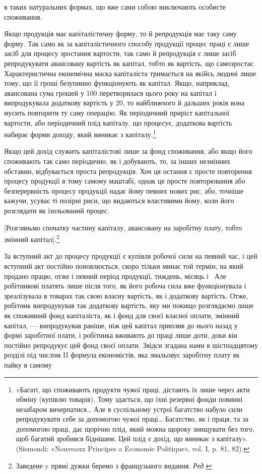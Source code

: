 \parcont{}  %
в таких натуральних формах, що вже сами собою виключають
особисте споживання.

Якщо продукція має капіталістичну форму, то й репродукція
має таку саму форму. Так само як за капіталістичного способу
продукції процес праці є лише засіб для процесу зростання
вартости, так само й репродукція є лише засіб репродукувати
авансовану вартість як капітал, тобто як вартість, що самозростає.
Характеристична економічна маска капіталіста тримається
на якійсь людині лише тому, що її гроші безупинно функціонують
як капітал. Якщо, наприклад, авансована сума грошей
у 100 перетворилася цього року на капітал
і випродукувала додаткову вартість у 20,
то найближчого й дальших років вона мусить повторити ту саму
операцію. Як періодичний приріст капітальної вартости, або
періодичний плід капіталу, що процесує, додаткова вартість набирає
форми доходу, який виникає з капіталу.\footnote{
«Багаті, що споживають продукти чужої праці, дістають їх лише
через акти обміну (купівлю товарів). Тому здається, що їхні резервні
фонди повинні незабаром вичерпатися\dots{} Але в суспільному устрої багатство
набуло сили репродукувати себе за допомогою чужої праці\dots{} Багатство,
як і праця, та за допомогою праці, дає щорічно плід, який можна
щороку знищувати без того, щоб багатий зробився біднішим. Цей плід є
дохід, що виникає з капіталу». (Sismondi: «Nouveaux Principes a Economie
Politique», vol. I, p. 81, 82).
}

Якщо цей дохід служить капіталістові лише за фонд споживання,
або якщо його споживають так само періодично, як і
добувають, то, за інших незмінних обставин, відбувається проста
репродукція. Хоч ця остання є просте повторення процесу продукції
в тому самому маштабі, однак це просте повторювання або
безперервність процесу продукції надає йому певних нових рис,
або, точніше кажучи, усуває ті позірні риси, що видаються властивими
йому, коли його розглядати як ізольований процес.

[Розгляньмо спочатку частину капіталу, авансовану на заробітну
плату, тобто змінний капітал].\footnote*{
Заведене y прямі дужки беремо з французького видання. \emph{Ред.}
}

За вступний акт до процесу продукції є купівля робочої сили
на певний час, і цей вступний акт постійно поновлюється, скоро
тільки минає той термін, на який продано працю, отже і певний
період продукції, тиждень, місяць і~ Але робітникові платять
лише після того, як його робоча сила вже функціонувала і зреалізувала
в товарах так свою власну вартість, як і додаткову вартість.
Отже, робітник випродукував так додаткову вартість, яку
ми покищо розглядаємо лише як споживний фонд капіталіста,
як і фонд для своєї власної оплати, змінний капітал, — випродукував
раніше, ніж цей капітал приплив до нього назад у формі
заробітної плати, і робітника вживають до праці лише доти,
доки він постійно репродукує цей фонд своєї оплати. Звідси
згадана нами в шістнадцятому розділі під числом II формула
економістів, яка змальовує заробітну плату як пайку в самому
\parbreak{}  %
